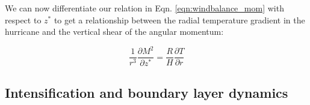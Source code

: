 We can now differentiate our relation in Eqn. \ref{eqn:windbalance_mom} with respect to $z^*$ to get a relationship between the radial temperature gradient in the hurricane and the vertical shear of the angular momentum:

\begin{equation}
    \frac{1}{r^3}\frac{\partial M^2}{\partial z^*}=\frac{R}{H}\frac{\partial T}{\partial r}
\end{equation}


\subsection{Intensification and boundary layer dynamics}

